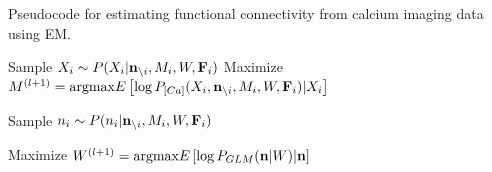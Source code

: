 \begin{algorithm}
\caption{Pseudocode for estimating functional connectivity from calcium imaging data using EM.}\label{eqn:pseudocode}
\begin{algorithmic}
      \State Sample $X_i \sim P(X_i|{\bf n}_{\backslash i}, M_i, W, {\bf F}_i)$
      \State Maximize $M^{(l+1)}=\text{argmax} E\left[\log P_{[Ca]}(X_i, {\bf n}_{\backslash i}, M_i, W, {\bf F}_i)|X_i\right]$
    \EndWhile
  \EndFor
  
      \State Sample $n_i \sim P(n_i|{\bf n}_{\backslash i}, M_i, W, {\bf F}_i)$
    \EndFor
  \EndFor 

  \State Maximize $W^{(l+1)}=\text{argmax} E\left[\log P_{GLM}({\bf n}|W)|{\bf n}\right]$  
\EndWhile
\end{algorithmic}
\end{algorithm}

